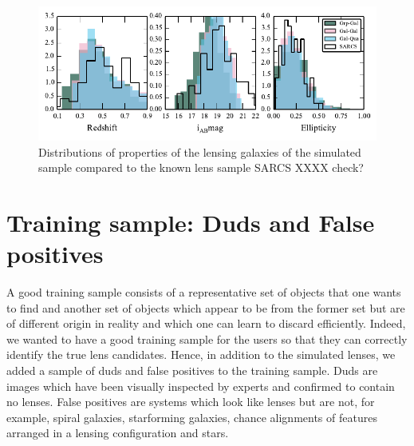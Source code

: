 \documentclass[useAMS,usenatbib,a4paper]{mn2e}
\begin{document}
\begin{figure}
\begin{center}
\includegraphics[scale=1.3]{sw-cfhtls-figs/lensprop.pdf}
\caption{ \label{fig:lensprop}
Distributions of properties of the lensing galaxies of the simulated
sample compared to the known lens sample SARCS XXXX check? 
}
\end{center}
\end{figure}


%
%



\section{Training sample: Duds and False positives}
\label{sec:dfp}

A good training sample consists of a representative set of objects that
one wants to find and another set of objects which appear to be from the
former set but are of different origin in reality and which one can
learn to discard efficiently. Indeed, we wanted to have a good training
sample for the \sw users so that they can correctly identify the true
lens candidates. Hence, in addition to the simulated lenses, we
added a sample of duds and false positives to the training sample. Duds
are images which have been visually inspected by experts and confirmed
to contain no lenses.  False positives are systems which look like
lenses but are not, for example, spiral galaxies, starforming galaxies,
chance alignments of features arranged in a lensing configuration and
stars. 
\end{document}
